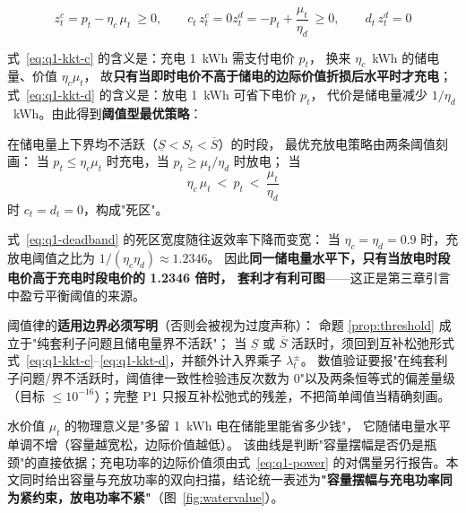 \begin{subequations}\label{eq:q1-kkt}
  \begin{equation}
    z^{c}_t=p_t-\eta_c\,\mu_{t}\ \ge 0,\qquad
    c_t\,z^{c}_t=0
    \label{eq:q1-kkt-c}
  \end{equation}
  \begin{equation}
    z^{d}_t=-p_t+\frac{\mu_{t}}{\eta_d}\ \ge 0,\qquad
    d_t\,z^{d}_t=0
    \label{eq:q1-kkt-d}
  \end{equation}
\end{subequations}

式~\eqref{eq:q1-kkt-c} 的含义是：充电 1~kWh 需支付电价 \(p_t\)，
换来 \(\eta_c\)~kWh 的储电量、价值 \(\eta_c\mu_{t}\)，
故\textbf{只有当即时电价不高于储电的边际价值折损后水平时才充电}；
式~\eqref{eq:q1-kkt-d} 的含义是：放电 1~kWh 可省下电价 \(p_t\)，
代价是储电量减少 \(1/\eta_d\)~kWh。由此得到\textbf{阈值型最优策略}：

\begin{proposition}[阈值律]\label{prop:threshold}
在储电量上下界均不活跃（\(\underline S<S_t<\overline S\)）的时段，
最优充放电策略由两条阈值刻画：
当 \(p_t\le \eta_c\mu_{t}\) 时充电，当 \(p_t\ge \mu_{t}/\eta_d\) 时放电；
当
\begin{equation}
  \eta_c\,\mu_{t}\ <\ p_t\ <\ \frac{\mu_{t}}{\eta_d}
  \label{eq:q1-deadband}
\end{equation}
时 \(c_t=d_t=0\)，构成"死区"。
\end{proposition}

式~\eqref{eq:q1-deadband} 的死区宽度随往返效率下降而变宽：
当 \(\eta_c=\eta_d=0.9\) 时，充放电阈值之比为 \(1/(\eta_c\eta_d)\approx 1.2346\)。
因此\textbf{同一储电量水平下，只有当放电时段电价高于充电时段电价的 1.2346 倍时，
套利才有利可图}——这正是第三章引言中盈亏平衡阈值的来源。

\begin{guideblock}
阈值律的\textbf{适用边界必须写明}（否则会被视为过度声称）：
命题 \ref{prop:threshold} 成立于"纯套利子问题且储电量界不活跃"；
当 \(\underline S\) 或 \(\overline S\) 活跃时，须回到互补松弛形式
式~\eqref{eq:q1-kkt-c}--\eqref{eq:q1-kkt-d}，并额外计入界乘子 \(\lambda^{\pm}_t\)。
数值验证要报"在纯套利子问题/界不活跃时，阈值律一致性检验违反次数为 0"以及两条恒等式的偏差量级
（目标 \(\le 10^{-16}\)）；完整 P1 只报互补松弛式的残差，不把简单阈值当精确刻画。
\end{guideblock}

水价值 \(\mu_t\) 的物理意义是"多留 1~kWh 电在储能里能省多少钱"，
它随储电量水平单调不增（容量越宽松，边际价值越低）。
该曲线是判断"容量摆幅是否仍是瓶颈"的直接依据；充电功率的边际价值须由式~\eqref{eq:q1-power} 的对偶量另行报告。本文同时给出容量与充放功率的双向扫描，结论统一表述为\textbf{"容量摆幅与充电功率同为紧约束，放电功率不紧"}（图~\ref{fig:watervalue}）。

